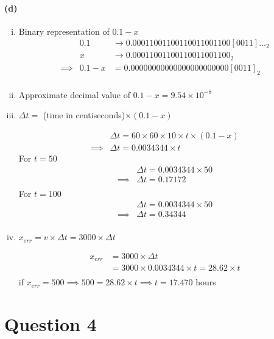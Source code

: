 \documentclass{article}
\begin{document}
\paragraph{(d)}
\begin{enumerate}[(i)]
\item Binary representation of $0.1 - x$
\begin{align*}
  &0.1 &\rightarrow 0.00011001100110011001100[0011]..._2\\
  &x   &\rightarrow 0.00011001100110011001100_2\\
  \implies &0.1 - x &= 0.00000000000000000000000[0011]_2\\
\end{align*}
\item Approximate decimal value of $0.1 - x = 9.54 \times 10^{-8}$
\item $\Delta t = $ (time in centiseconds)$\times (0.1 - x)$
  
\begin{align*}
  &\Delta t = 60 \times 60 \times 10 \times t \times (0.1 - x)\\
  \implies &\Delta t = 0.0034344 \times t
\end{align*}
For $t = 50$
\begin{align*}
  &\Delta t = 0.0034344 \times 50\\
  \implies &\Delta t = 0.17172\\
\end{align*}
For $t = 100$
\begin{align*}
  &\Delta t = 0.0034344 \times 50\\
  \implies &\Delta t = 0.34344\\
\end{align*}

\item $x_{err} = v \times \Delta t = 3000 \times \Delta t$
  
\begin{align*}
x_{err} &= 3000 \times \Delta t\\
       &= 3000 \times 0.0034344 \times t = 28.62 \times t\\
\end{align*}
if $x_{err} = 500 \implies 500 = 28.62 \times t \implies t = 17.470$ hours
\end{enumerate}

\pagebreak
\section*{Question 4}
\label{sec:question-4}
\end{document}
